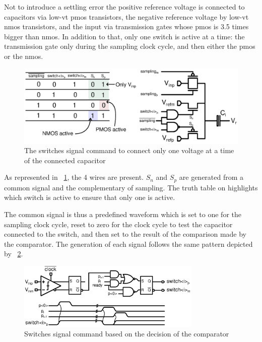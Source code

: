 Not to introduce a settling error the positive reference voltage is connected to capacitors via low-vt pmos transistors, the negative reference voltage by low-vt nmos transistors, and the input via transmission gates whose pmos is 3.5 times bigger than nmos. In addition to that, only one switch is active at a time: the transmission gate only during the sampling clock cycle, and then either the pmos or the nmos.

\begin{figure}[htp]
	\centering
	\includegraphics[width=\textwidth]{Chapter4/Figs/sar-switches-command-simp.ps}
	\caption{The switches signal command to connect only one voltage at a time of the connected capacitor}
	\label{fig:switches-command}
\end{figure}

As represented in \figurename~\ref{fig:switches-command}, the 4 wires are present. \(S_n\) and \(S_p\) are generated from a common signal and the complementary of sampling. The truth table on highlights which switch is active to ensure that only one is active.

The common signal is thus a predefined waveform which is set to one for the sampling clock cycle, reset to zero for the clock cycle to test the capacitor connected to the switch, and then set to the result of the comparison made by the comparator. The generation of each signal follows the same pattern depicted by \figurename~\ref{fig:comp-decision-switches}.

\begin{figure}[htp]
	\centering
	\includegraphics[width=0.78\textwidth]{Chapter4/Figs/comp-decisin-switches.ps}
	\caption{Switches signal command based on the decision of the comparator}
	\label{fig:comp-decision-switches}
\end{figure}

